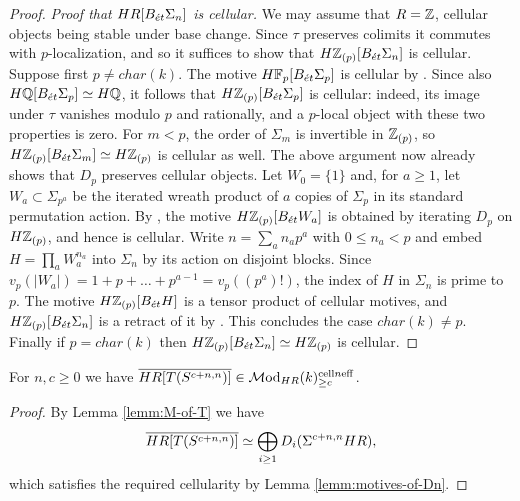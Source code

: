 \documentclass{amsart}
\renewcommand{\NB}[1]{}
\numberwithin{proposition}{section}
\numberwithin{equation}{section}
\def\cell{\mathrm{cell}}
\begin{document}
\begin{proof}
\textit{Proof that $HR[B_{\acute{e}t}\Sigma_n]$ is cellular.}
We may assume that $R=\mathbb{Z}$, cellular objects being stable under base change.
Since $\tau$ preserves colimits it commutes with $p$-localization, and so it suffices to show that $H\mathbb{Z}_{(p)}[B_{\acute{e}t}\Sigma_n]$ is cellular.
Suppose first $p \ne char(k)$.
The motive $H\mathbb{F}_p[B_{\acute{e}t}\Sigma_p]$ is cellular by \cite[Theorem~6.16]{voevodsky2003reduced}.
Since also $H\mathbb{Q}[B_{\acute{e}t}\Sigma_p] \simeq H\mathbb{Q}$, it follows that $H\mathbb{Z}_{(p)}[B_{\acute{e}t}\Sigma_p]$ is cellular: indeed, its image under $\tau$ vanishes modulo $p$ and rationally, and a $p$-local object with these two properties is zero.
For $m<p$, the order of $\Sigma_m$ is invertible in $\mathbb{Z}_{(p)}$, so $H\mathbb{Z}_{(p)}[B_{\acute{e}t}\Sigma_m] \simeq H\mathbb{Z}_{(p)}$ is cellular as well.
The above argument now already shows that $D_p$ preserves cellular objects.
Let $W_0=\{1\}$ and, for $a\ge1$, let $W_a\subset\Sigma_{p^a}$ be the iterated wreath product of $a$ copies of $\Sigma_p$ in its standard permutation action.
By \cite[Proposition~5.28 and Example~5.10]{bachmann-colimits}, the motive $H\mathbb{Z}_{(p)}[B_{\acute{e}t} W_a]$ is obtained by iterating $D_p$ on $H\mathbb{Z}_{(p)}$, and hence is cellular.
Write $n=\sum_a n_ap^a$ with $0\le n_a<p$ and embed $H=\prod_a W_a^{n_a}$ into $\Sigma_n$ by its action on disjoint blocks.
Since $v_p(|W_a|)=1+p+\dots+p^{a-1}=v_p((p^a)!)$, the index of $H$ in $\Sigma_n$ is prime to $p$.
The motive $H\mathbb{Z}_{(p)}[B_{\acute{e}t} H]$ is a tensor product of cellular motives, and $H\mathbb{Z}_{(p)}[B_{\acute{e}t}\Sigma_n]$ is a retract of it by \cite[Proposition~5.39]{bachmann-colimits}.
This concludes the case $char(k) \ne p$.
Finally if $p = char(k)$ then $H\mathbb{Z}_{(p)}[B_{\acute{e}t}\Sigma_n] \simeq H\mathbb{Z}_{(p)}$ \cite[Proposition~2.1(3)]{bachmann-linearity} is cellular.
\end{proof}

\begin{lemma} \label{lemm:T-sphere-cellular}\NB{more generally $\overline{HR[\ph]}$ preserves cellular categories}
For $n, c \ge 0$ we have $\overline{HR[T(S^{c+n,n})]} \in \Mod_{HR}(k)^{\cell n \eff}_{\ge c}$.
\end{lemma}
\begin{proof}
By Lemma \ref{lemm:M-of-T} we have \[ \overline{HR[T(S^{c+n,n})]} \simeq \bigoplus_{i \ge 1} D_i(\Sigma^{c+n,n}HR), \] which satisfies the required cellularity by Lemma \ref{lemm:motives-of-Dn}.
\end{proof}
\end{document}
